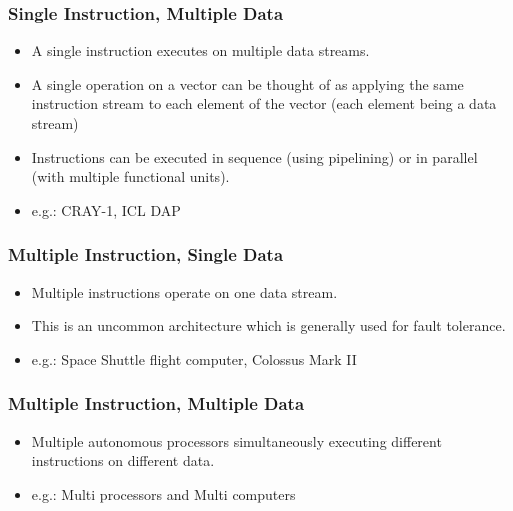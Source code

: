 \documentclass{article}
\begin{document}
\subsubsection{Single Instruction, Multiple Data}
\begin{itemize}
    \item A single instruction executes on multiple data streams. 
    
    \item A single operation on a vector can be thought of as applying the same instruction stream to each element of the vector (each element being a data stream)
    
    \item Instructions can be executed in sequence (using pipelining) or in parallel (with multiple functional units). 
    
    \item e.g.: CRAY-1, ICL DAP
\end{itemize}

\subsubsection{Multiple Instruction, Single Data}
\begin{itemize}
    \item Multiple instructions operate on one data stream. 
    
    \item This is an uncommon architecture which is generally used for fault tolerance.
    
    \item e.g.: Space Shuttle flight computer, Colossus Mark II
\end{itemize}

\subsubsection{Multiple Instruction, Multiple Data}
\begin{itemize}
    \item Multiple autonomous processors simultaneously executing different instructions on different data. 
    
    \item e.g.: Multi processors and Multi computers
\end{itemize}
\end{document}
